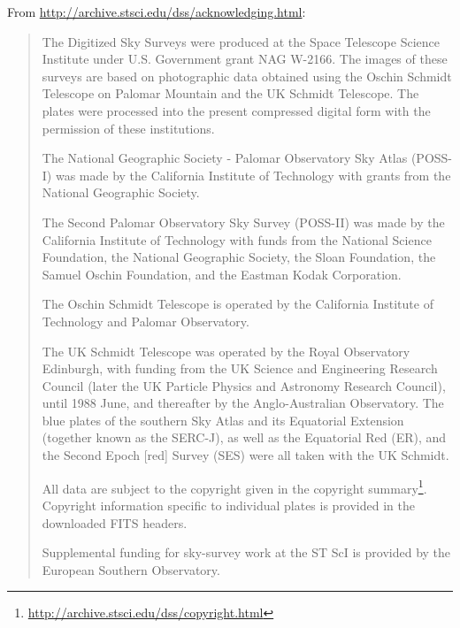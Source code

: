 From \url{http://archive.stsci.edu/dss/acknowledging.html}: %
\begin{quotation}
\noindent The Digitized Sky Surveys were produced at the Space Telescope Science Institute under U.S. Government grant NAG W-2166. 
The images of these surveys are based on photographic data obtained using the Oschin Schmidt Telescope on Palomar Mountain and the UK Schmidt Telescope. 
The plates were processed into the present compressed digital form with the permission of these institutions.

The National Geographic Society - Palomar Observatory Sky Atlas (POSS-I) was made by the 
California Institute of Technology with grants from the National Geographic Society.

The Second Palomar Observatory Sky Survey (POSS-II) was made by the California Institute of Technology with 
funds from the National Science Foundation, the National Geographic Society, the Sloan Foundation, 
the Samuel Oschin Foundation, and the Eastman Kodak Corporation.

The Oschin Schmidt Telescope is operated by the California Institute of Technology and Palomar Observatory.

The UK Schmidt Telescope was operated by the Royal Observatory Edinburgh, with funding from the 
UK Science and Engineering Research Council (later the UK Particle Physics and Astronomy Research Council), 
until 1988 June, and thereafter by the Anglo-Australian Observatory. 
The blue plates of the southern Sky Atlas and its Equatorial Extension (together known as the SERC-J), 
as well as the Equatorial Red (ER), and the Second Epoch [red] Survey (SES) were all taken with the UK Schmidt.

All data are subject to the copyright given in the copyright summary\footnote{\url{http://archive.stsci.edu/dss/copyright.html}}. 
Copyright information specific to individual plates is provided in the downloaded FITS headers.

Supplemental funding for sky-survey work at the ST ScI is provided by the European Southern Observatory. 
\end{quotation}


